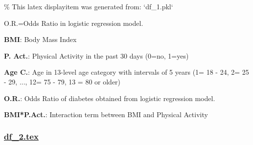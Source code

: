 \documentclass[11pt]{article}
\begin{document}
\begin{codeoutput}
\% This latex displayitem was generated from: `df\_1.pkl`

\begin{table}[h]
\caption{Logistic regression effect of physical activity on BMI and Diabetes, with age control}
\label{table:df\_1}
\begin{threeparttable}
\renewcommand{\TPTminimum}{\linewidth}
\begin{tablenotes}
\footnotesize
\item O.R.=Odds Ratio in logistic regression model.
\item \textbf{BMI}: Body Mass Index
\item \textbf{P. Act.}: Physical Activity in the past 30 days (0=no, 1=yes)
\item \textbf{Age C.}: Age in 13-level age category with intervals of 5 years (1= 18 - 24, 2= 25 - 29, ..., 12= 75 - 79, 13 = 80 or older)
\item \textbf{O.R.}: Odds Ratio of diabetes obtained from logistic regression model.
\item \textbf{BMI*P.Act.}: Interaction term between BMI and Physical Activity
\end{tablenotes}
\end{threeparttable}
\end{table}
\end{codeoutput}

\subsubsection*{\hyperlink{code-LaTeX Table Design-df-2-tex}{df\_2.tex}}
\end{document}
